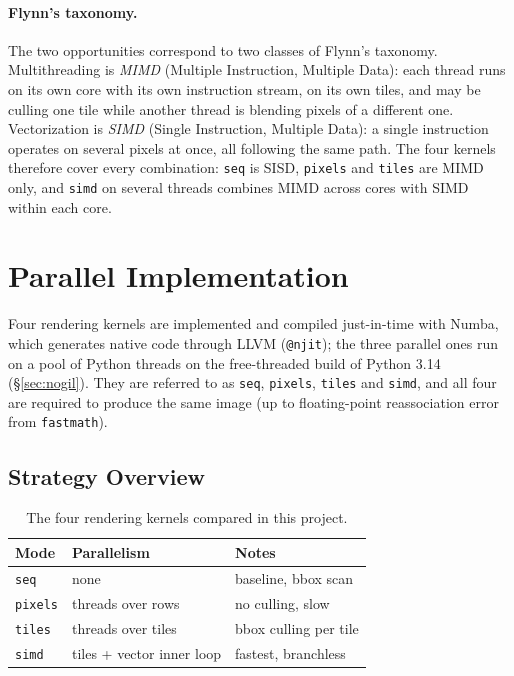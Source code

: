 \documentclass[10pt,twocolumn,letterpaper]{article}
\begin{document}
\paragraph{Flynn's taxonomy.} The two opportunities correspond to two
classes of Flynn's taxonomy. Multithreading is \emph{MIMD} (Multiple
Instruction, Multiple Data): each thread runs on its own core with its own
instruction stream, on its own tiles, and may be culling one tile while
another thread is blending pixels of a different one. Vectorization is
\emph{SIMD} (Single Instruction, Multiple Data): a single instruction
operates on several pixels at once, all following the same path. The four
kernels therefore cover every combination: \texttt{seq} is SISD,
\texttt{pixels} and \texttt{tiles} are MIMD only, and \texttt{simd} on
several threads combines MIMD across cores with SIMD within each core.

\section{Parallel Implementation}

Four rendering kernels are implemented and compiled just-in-time with Numba, which
generates native code through LLVM
(\texttt{@njit}); the three parallel ones run on a pool of Python threads
on the free-threaded build of Python 3.14 (\S\ref{sec:nogil}). They are referred to as \texttt{seq},
\texttt{pixels}, \texttt{tiles} and \texttt{simd}, and all four are required to
produce the same image (up to floating-point reassociation error from
\texttt{fastmath}).

\subsection{Strategy Overview}

\begin{table}[h]
\centering
\small
\begin{tabular}{@{}lll@{}}
\toprule
\textbf{Mode} & \textbf{Parallelism} & \textbf{Notes} \\
\midrule
\texttt{seq}    & none              & baseline, bbox scan \\
\texttt{pixels} & threads over rows   & no culling, slow \\
\texttt{tiles}  & threads over tiles  & bbox culling per tile \\
\texttt{simd}   & tiles + vector inner loop & fastest, branchless \\
\bottomrule
\end{tabular}
\caption{The four rendering kernels compared in this project.}
\label{tab:kernels}
\end{table}
\end{document}

